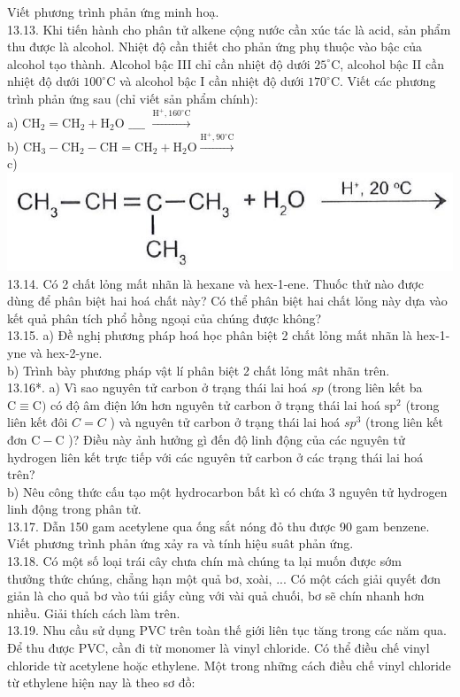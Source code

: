 \documentclass[10pt]{article}
\begin{document}
Viết phương trình phản ứng minh hoạ.\\
13.13. Khi tiến hành cho phân tử alkene cộng nước cần xúc tác là acid, sản phẩm thu được là alcohol. Nhiệt độ cần thiết cho phản ứng phụ thuộc vào bậc của alcohol tạo thành. Alcohol bậc III chỉ cần nhiệt độ dưới $25^{\circ} \mathrm{C}$, alcohol bậc II cần nhiệt độ dưới $100^{\circ} \mathrm{C}$ và alcohol bậc I cần nhiệt độ dưới $170^{\circ} \mathrm{C}$. Viết các phương trình phản ứng sau (chỉ viết sản phẩm chính):\\
a) $\mathrm{CH}_{2}=\mathrm{CH}_{2}+\mathrm{H}_{2} \mathrm{O}$ $\_\_\_\_$ $\xrightarrow{\mathrm{H}^{+}, 160^{\circ} \mathrm{C}}$\\
b) $\mathrm{CH}_{3}-\mathrm{CH}_{2}-\mathrm{CH}=\mathrm{CH}_{2}+\mathrm{H}_{2} \mathrm{O} \xrightarrow{\mathrm{H}^{+}, 90^{\circ} \mathrm{C}}$\\
c)\\
\includegraphics[max width=\textwidth, center]{2025_10_23_ae7aef68fb3b41082d29g-27}\\
13.14. Có 2 chất lỏng mất nhãn là hexane và hex-1-ene. Thuốc thử nào được dùng để phân biệt hai hoá chất này? Có thể phân biệt hai chất lỏng này dựa vào kết quả phân tích phổ hồng ngoại của chúng được không?\\
13.15. a) Đề nghị phương pháp hoá học phân biệt 2 chất lỏng mất nhãn là hex-1-yne và hex-2-yne.\\
b) Trình bày phương pháp vật lí phân biệt 2 chất lỏng mât nhãn trên.\\
13.16*. a) Vì sao nguyên tử carbon ở trạng thái lai hoá $s p$ (trong liên kết ba $\mathrm{C} \equiv \mathrm{C})$ có độ âm điện lớn hơn nguyên tử carbon ở trạng thái lai hoá $\mathrm{sp}^{2}$ (trong liên kết đôi $C=C$ ) và nguyên tử carbon ở trạng thái lai hoá $s p^{3}$ (trong liên kết đơn $\mathrm{C}-\mathrm{C}$ )? Điều này ảnh hưởng gì đến độ linh động của các nguyên tử hydrogen liên kết trực tiếp với các nguyên tử carbon ở các trạng thái lai hoá trên?\\
b) Nêu công thức cấu tạo một hydrocarbon bất kì có chứa 3 nguyên tử hydrogen linh động trong phân tử.\\
13.17. Dẫn 150 gam acetylene qua ống sắt nóng đỏ thu được 90 gam benzene. Viết phương trình phản ứng xảy ra và tính hiệu suât phản ứng.\\
13.18. Có một số loại trái cây chưa chín mà chúng ta lại muốn được sớm\\
thưởng thức chúng, chẳng hạn một quả bơ, xoài, ... Có một cách giải quyết đơn giản là cho quả bơ vào túi giấy cùng với vài quả chuối, bơ sẽ chín nhanh hơn nhiều. Giải thích cách làm trên.\\
13.19. Nhu cầu sử dụng PVC trên toàn thế giới liên tục tăng trong các năm qua. Để thu được PVC, cần đi từ monomer là vinyl chloride. Có thể điều chế vinyl chloride từ acetylene hoặc ethylene. Một trong những cách điều chế vinyl chloride từ ethylene hiện nay là theo sơ đồ:
\end{document}
